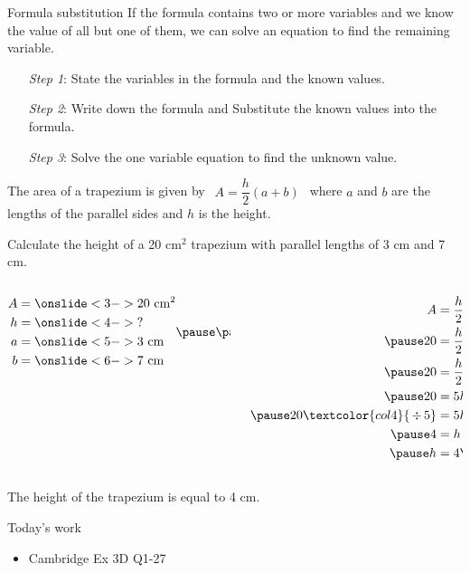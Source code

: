 \documentclass[aspectratio=169,10pt]{beamer}
\begin{document}
\begin{frame}{Formula substitution}
    If the formula contains two or more variables and we know the value of all but one of them, we can solve an equation to find the remaining variable.\pause
        {\setlength\leftmargini{7ex}
    \begin{enumerate}
    	\item[\textit{Step 1}:] State the variables in the formula and the known values.\pause
    	\item[\textit{Step 2}:] Write down the formula and Substitute the known values into the formula.\pause
    	\item[\textit{Step 3}:] Solve the one variable equation to find the unknown value.
    \end{enumerate}}
\end{frame}

\begin{frame}
  \begin{example}
    The area of a trapezium is given by $\ \ A=\dfrac{h}{2}(a+b)\ \ $ where $a$ and $b$ are the lengths of the parallel sides and $h$ is the height.
    
    Calculate the height of a 20 cm$^2$ trapezium with parallel lengths of 3 cm and 7 cm.
  \end{example}\pause
  \begin{solution}[]
    \vspace{-3em}
    \begin{columns}[t]
      \begin{column}{.3\textwidth}
      \[
      \begin{aligned}
        A&=\onslide<3->{20\text{ cm}^2}\\
        h&=\onslide<4->{?}\\
        a&=\onslide<5->{3\text{ cm}}\\
        b&=\onslide<6->{7\text{ cm}}
      \end{aligned}\pause\pause\pause\pause\pause
      \]
    \end{column}
    \begin{column}{.5\textwidth}
      \[
      \begin{aligned}
        A&=\frac{h}{2}(a+b)\\\pause
        20&=\frac{h}{2}(3+7)\\\pause
        20&=\frac{h}{2}(10)\\\pause
        20&=5h\\\pause
        20\textcolor{col4}{\,\div\,5}&=5h\textcolor{col4}{\,\div\,5}\\\pause
        4&=h\\\pause
        h&=4\pause\text{ cm}
      \end{aligned}
      \]
    \end{column}
  \end{columns}
  The height of the trapezium is equal to 4 cm.
  \end{solution}
\end{frame}

\begin{frame}{Today's work}
  \begin{itemize} 
    \item Cambridge Ex 3D Q1-27
  \end{itemize}
\end{frame}
\end{document}
